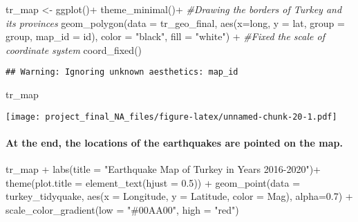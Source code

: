 \documentclass[
]{article}
\newenvironment{Shaded}{\begin{snugshade}}{\end{snugshade}}
\newcommand{\AttributeTok}[1]{\textcolor[rgb]{0.77,0.63,0.00}{#1}}
\newcommand{\CommentTok}[1]{\textcolor[rgb]{0.56,0.35,0.01}{\textit{#1}}}
\newcommand{\FloatTok}[1]{\textcolor[rgb]{0.00,0.00,0.81}{#1}}
\newcommand{\FunctionTok}[1]{\textcolor[rgb]{0.00,0.00,0.00}{#1}}
\newcommand{\NormalTok}[1]{#1}
\newcommand{\OtherTok}[1]{\textcolor[rgb]{0.56,0.35,0.01}{#1}}
\newcommand{\SpecialCharTok}[1]{\textcolor[rgb]{0.00,0.00,0.00}{#1}}
\newcommand{\StringTok}[1]{\textcolor[rgb]{0.31,0.60,0.02}{#1}}
\begin{document}
\begin{Shaded}
\begin{Highlighting}[]
\NormalTok{tr\_map }\OtherTok{\textless{}{-}} \FunctionTok{ggplot}\NormalTok{()}\SpecialCharTok{+}
            \FunctionTok{theme\_minimal}\NormalTok{()}\SpecialCharTok{+}
            \CommentTok{\#Drawing the borders of Turkey and its provinces}
            \FunctionTok{geom\_polygon}\NormalTok{(}\AttributeTok{data =}\NormalTok{ tr\_geo\_final, }\FunctionTok{aes}\NormalTok{(}\AttributeTok{x=}\NormalTok{long, }\AttributeTok{y =}\NormalTok{ lat, }\AttributeTok{group =}\NormalTok{ group, }\AttributeTok{map\_id =}\NormalTok{ id),}
                         \AttributeTok{color =} \StringTok{"black"}\NormalTok{, }\AttributeTok{fill =} \StringTok{"white"}\NormalTok{) }\SpecialCharTok{+}
            \CommentTok{\#Fixed the scale of coordinate system}
            \FunctionTok{coord\_fixed}\NormalTok{()}
\end{Highlighting}
\end{Shaded}

\begin{verbatim}
## Warning: Ignoring unknown aesthetics: map_id
\end{verbatim}

\begin{Shaded}
\begin{Highlighting}[]
\NormalTok{tr\_map}
\end{Highlighting}
\end{Shaded}

\texttt{[image: project\_final\_NA\_files/figure-latex/unnamed-chunk-20-1.pdf]}

\hypertarget{at-the-end-the-locations-of-the-earthquakes-are-pointed-on-the-map.}{%
\paragraph{At the end, the locations of the earthquakes are pointed on
the
map.}\label{at-the-end-the-locations-of-the-earthquakes-are-pointed-on-the-map.}}

\begin{Shaded}
\begin{Highlighting}[]
\NormalTok{tr\_map }\SpecialCharTok{+}
  \FunctionTok{labs}\NormalTok{(}\AttributeTok{title =} \StringTok{"Earthquake Map of Turkey in Years 2016{-}2020"}\NormalTok{)}\SpecialCharTok{+}
  \FunctionTok{theme}\NormalTok{(}\AttributeTok{plot.title =} \FunctionTok{element\_text}\NormalTok{(}\AttributeTok{hjust =} \FloatTok{0.5}\NormalTok{)) }\SpecialCharTok{+}
  \FunctionTok{geom\_point}\NormalTok{(}\AttributeTok{data =}\NormalTok{ turkey\_tidyquake, }\FunctionTok{aes}\NormalTok{(}\AttributeTok{x =}\NormalTok{ Longitude, }\AttributeTok{y =}\NormalTok{ Latitude, }\AttributeTok{color =}\NormalTok{ Mag), }\AttributeTok{alpha=}\FloatTok{0.7}\NormalTok{) }\SpecialCharTok{+}
  \FunctionTok{scale\_color\_gradient}\NormalTok{(}\AttributeTok{low =} \StringTok{"\#00AA00"}\NormalTok{, }\AttributeTok{high =} \StringTok{"red"}\NormalTok{)}
\end{Highlighting}
\end{Shaded}
\end{document}
